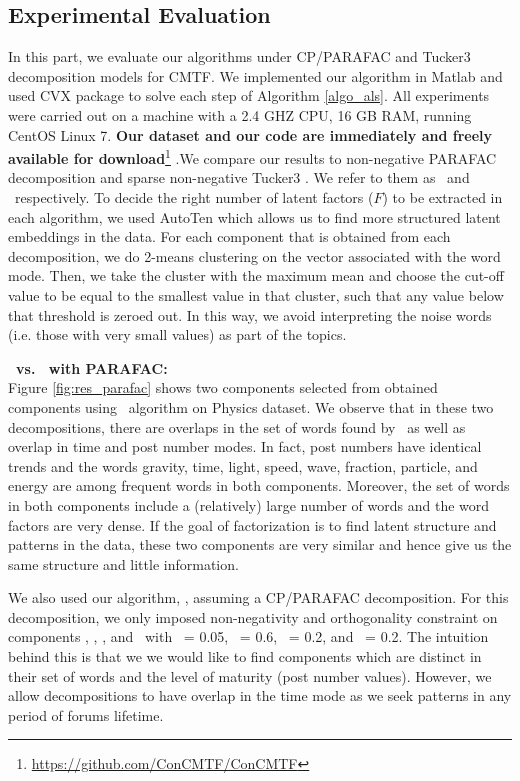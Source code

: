 \subsection{Experimental Evaluation}
 In this part, we evaluate our algorithms under CP/PARAFAC and Tucker3 decomposition models for CMTF.
 We implemented our algorithm in Matlab and used CVX package to solve each step of Algorithm \ref{algo_als}.
 All experiments were carried out on a machine with a 2.4 GHZ CPU, 16 GB RAM, running CentOS Linux 7. 
 \textbf{ Our dataset and our code are immediately and freely available for download}\footnote{
     \url{https://github.com/ConCMTF/ConCMTF}}
 .We compare our results to non-negative PARAFAC decomposition \cite{morup2006sparse} and sparse
 non-negative Tucker3 \cite{papalexakis2012parcube}. We refer to them  as \paraNS\ and \tuckerNS\
 respectively. To decide the right number of latent factors ($F$) to be extracted in each algorithm,
 we used AutoTen \cite{papalexakis2016automatic} which allows us to find more structured latent
 embeddings in the data. For each component that is obtained from each decomposition, we do 2-means
 clustering on the vector associated with the word mode. Then, we take the cluster with the maximum
 mean and choose the cut-off value to be equal to the smallest value in that cluster, such that any
 value below that threshold is zeroed out. In this way, we avoid interpreting the noise words (i.e.
 those with very small values) as part of the topics.

\textbf{\paraNS\ vs. \ourAlgo\ with PARAFAC:}\\
Figure \ref{fig:res_parafac} shows two components selected from obtained components  using \paraNS\
algorithm on Physics dataset. We observe that in these two decompositions, there are overlaps in the set of words found
by \paraNS\  as well as overlap in time and post number modes. In fact,  post numbers have identical
trends  and the words gravity, time, light, speed, wave, fraction, particle, and energy are among
frequent words in both components. Moreover, the set of words in both components include a (relatively)
large number of words and the word factors are very dense. If the goal of factorization is to find latent
structure and patterns in the data, these two components are very similar and hence give us the same
structure and little information.

We also used our algorithm, \ourAlgo, assuming a CP/PARAFAC decomposition.  For this decomposition, we
only imposed non-negativity and orthogonality constraint on components \factA, \factB, \factC, and
\factD\ with \epsOrthogA\ = 0.05, \epsOrthogB\ = 0.6, \epsOrthogC\ = 0.2, and \epsOrthogD\ = 0.2. The
intuition behind this is that we we would like to find components which are distinct in their set of
words and the level of maturity (post number values). However, we allow decompositions to have overlap
in the time mode as we seek patterns in any period of forums lifetime. 

